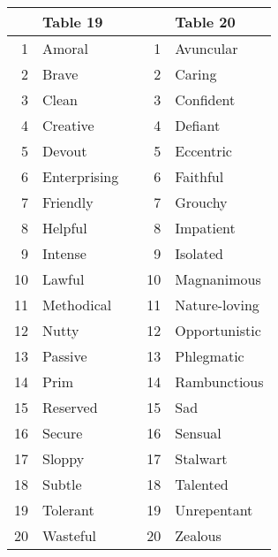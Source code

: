 \documentclass[12pt]{article}
\begin{document}
\begin{tabular}{r|l l r|l}
 & Table 19 & & & Table 20 \\\hline
 1 & Amoral & &  1 & Avuncular\\
 2 & Brave & &  2 & Caring\\
 3 & Clean & &  3 & Confident\\
 4 & Creative & &  4 & Defiant\\
 5 & Devout & &  5 & Eccentric\\
 6 & Enterprising & &  6 & Faithful\\
 7 & Friendly & &  7 & Grouchy\\
 8 & Helpful & &  8 & Impatient\\
 9 & Intense & &  9 & Isolated\\
10 & Lawful & & 10 & Magnanimous\\
11 & Methodical & & 11 & Nature-loving\\
12 & Nutty & & 12 & Opportunistic\\
13 & Passive & & 13 & Phlegmatic\\
14 & Prim & & 14 & Rambunctious\\
15 & Reserved & & 15 & Sad\\
16 & Secure & & 16 & Sensual\\
17 & Sloppy & & 17 & Stalwart\\
18 & Subtle & & 18 & Talented\\
19 & Tolerant & & 19 & Unrepentant\\
20 & Wasteful & & 20 & Zealous\\
\end{tabular}
\end{document}
